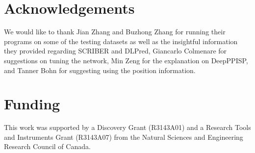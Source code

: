 \documentclass{bioinfo}
\begin{document}
\section*{Acknowledgements}
We would like to thank Jian Zhang and Buzhong Zhang for running their programs on some of the testing datasets as well as the insightful information they provided regarding SCRIBER and DLPred, Giancarlo Colmenare for suggestions on tuning the network, Min Zeng for the explanation on DeepPPISP, and Tanner Bohn for suggesting using the position information.

\section*{Funding}
This work was supported by a Discovery Grant (R3143A01) and a Research Tools and Instruments Grant (R3143A07) from the Natural Sciences and Engineering Research Council of Canada.

%
%
%
%
% 

 
\end{document}
